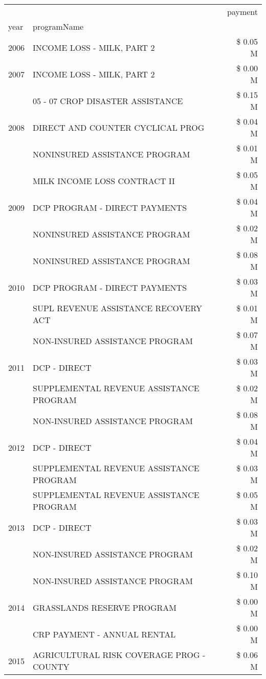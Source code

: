 \begin{tabular}{llr}
\toprule
 &  & payment \\
year & programName &  \\
\midrule
2006 & INCOME LOSS - MILK, PART 2 & \$ 0.05 M \\
\cline{1-3}
2007 & INCOME LOSS - MILK, PART 2 & \$ 0.00 M \\
\cline{1-3}
\multirow[t]{3}{*}{2008} & 05 - 07 CROP DISASTER ASSISTANCE & \$ 0.15 M \\
 & DIRECT AND COUNTER CYCLICAL PROG & \$ 0.04 M \\
 & NONINSURED ASSISTANCE PROGRAM & \$ 0.01 M \\
\cline{1-3}
\multirow[t]{3}{*}{2009} & MILK INCOME LOSS CONTRACT II & \$ 0.05 M \\
 & DCP PROGRAM - DIRECT PAYMENTS & \$ 0.04 M \\
 & NONINSURED ASSISTANCE PROGRAM & \$ 0.02 M \\
\cline{1-3}
\multirow[t]{3}{*}{2010} & NONINSURED ASSISTANCE PROGRAM & \$ 0.08 M \\
 & DCP PROGRAM - DIRECT PAYMENTS & \$ 0.03 M \\
 & SUPL REVENUE ASSISTANCE RECOVERY ACT & \$ 0.01 M \\
\cline{1-3}
\multirow[t]{3}{*}{2011} & NON-INSURED ASSISTANCE PROGRAM & \$ 0.07 M \\
 & DCP - DIRECT & \$ 0.03 M \\
 & SUPPLEMENTAL REVENUE ASSISTANCE PROGRAM & \$ 0.02 M \\
\cline{1-3}
\multirow[t]{3}{*}{2012} & NON-INSURED ASSISTANCE PROGRAM & \$ 0.08 M \\
 & DCP - DIRECT & \$ 0.04 M \\
 & SUPPLEMENTAL REVENUE ASSISTANCE PROGRAM & \$ 0.03 M \\
\cline{1-3}
\multirow[t]{3}{*}{2013} & SUPPLEMENTAL REVENUE ASSISTANCE PROGRAM & \$ 0.05 M \\
 & DCP - DIRECT & \$ 0.03 M \\
 & NON-INSURED ASSISTANCE PROGRAM & \$ 0.02 M \\
\cline{1-3}
\multirow[t]{3}{*}{2014} & NON-INSURED ASSISTANCE PROGRAM & \$ 0.10 M \\
 & GRASSLANDS RESERVE PROGRAM & \$ 0.00 M \\
 & CRP PAYMENT - ANNUAL RENTAL & \$ 0.00 M \\
\cline{1-3}
\multirow[t]{3}{*}{2015} & AGRICULTURAL RISK COVERAGE PROG - COUNTY & \$ 0.06 M \\

\end{tabular}
